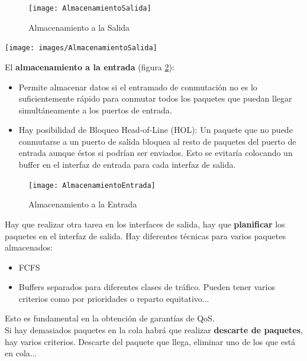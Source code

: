 \documentclass[10pt,portrait, twocolumn]{article}
\begin{document}
\begin{figure}[h]
	\centering
     \texttt{[image: AlmacenamientoSalida]}
      \caption{Almacenamiento a la Salida}
      \label{fig:salida}
\end{figure}


\begin{center}
	\texttt{[image: images/AlmacenamientoSalida]}
\end{center}

El \textbf{almacenamiento a la entrada}  (figura \ref{fig:entrada}):

\begin{itemize}
\item Permite almacenar datos si el entramado de conmutación no es lo suficientemente rápido para conmutar todos los paquetes que puedan llegar simultáneamente a los puertos de entrada.\\
\item Hay posibilidad de Bloqueo Head-of-Line (HOL): Un paquete que no puede conmutarse a un puerto de salida bloquea al resto de paquetes del puerto de entrada aunque éstos si podrían ser enviados. Esto se evitaría colocando un buffer en el interfaz de entrada para cada interfaz de salida.
\end{itemize}

\begin{figure}[h]
	\centering
     \texttt{[image: AlmacenamientoEntrada]}
      \caption{Almacenamiento a la Entrada}
      \label{fig:entrada}
\end{figure}

Hay que realizar otra tarea en los interfaces de salida, hay que \textbf{planificar} los paquetes en el interfaz de salida. Hay diferentes técnicas para varios paquetes almacenados:

	\begin{itemize}
		\item FCFS
		\item Buffers separados para diferentes clases de tráfico. Pueden tener varios criterios como por prioridades o reparto equitativo...
	\end{itemize}
	
Esto es fundamental en la obtención de garantías de QoS.\\


Si hay demasiados paquetes en la cola habrá que realizar \textbf{descarte de paquetes}, hay varios criterios. Descarte del paquete que llega, eliminar uno de los que está en cola...
\end{document}
